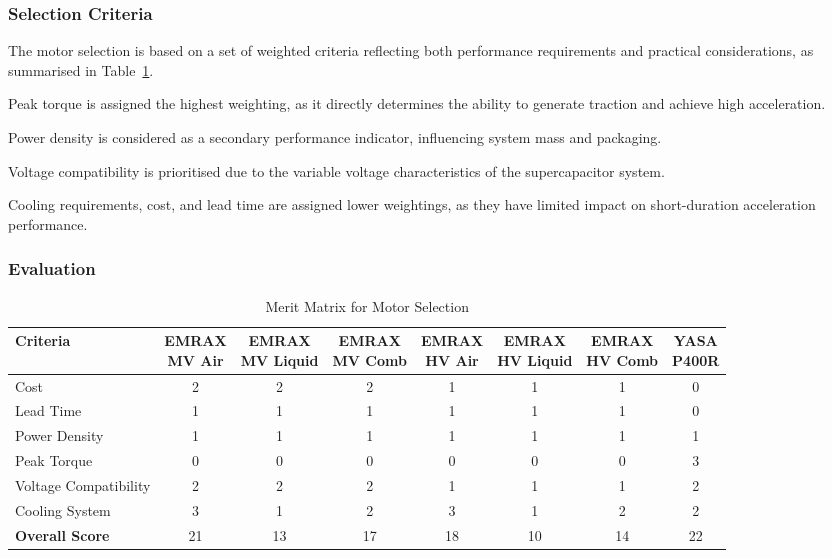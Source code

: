 \documentclass[a4paper,12pt]{article}
\begin{document}
\subsubsection{Selection Criteria}

The motor selection is based on a set of weighted criteria reflecting both performance requirements and practical considerations, as summarised in Table~\ref{tab:motor_selection}.

Peak torque is assigned the highest weighting, as it directly determines the ability to generate traction and achieve high acceleration.

Power density is considered as a secondary performance indicator, influencing system mass and packaging.

Voltage compatibility is prioritised due to the variable voltage characteristics of the supercapacitor system.

Cooling requirements, cost, and lead time are assigned lower weightings, as they have limited impact on short-duration acceleration performance.

\subsubsection{Evaluation}

\begin{table}[H]
\centering
\small
\renewcommand{\arraystretch}{1.5}
\setlength{\tabcolsep}{4pt}

\caption{Merit Matrix for Motor Selection}
\label{tab:motor_selection}

\begin{tabular}{lccccccc}
\toprule
\textbf{Criteria} 
& \shortstack{EMRAX \\ MV Air} 
& \shortstack{EMRAX \\ MV Liquid} 
& \shortstack{EMRAX \\ MV Comb} 
& \shortstack{EMRAX \\ HV Air} 
& \shortstack{EMRAX \\ HV Liquid} 
& \shortstack{EMRAX \\ HV Comb} 
& \shortstack{YASA \\ P400R} \\
\midrule
Cost & 2 & 2 & 2 & 1 & 1 & 1 & 0 \\
Lead Time & 1 & 1 & 1 & 1 & 1 & 1 & 0 \\
Power Density & 1 & 1 & 1 & 1 & 1 & 1 & 1 \\
Peak Torque & 0 & 0 & 0 & 0 & 0 & 0 & 3 \\
Voltage Compatibility & 2 & 2 & 2 & 1 & 1 & 1 & 2 \\
Cooling System & 3 & 1 & 2 & 3 & 1 & 2 & 2 \\
\midrule
\textbf{Overall Score} & 21 & 13 & 17 & 18 & 10 & 14 & 22 \\
\bottomrule
\end{tabular}
\end{table}
\end{document}
